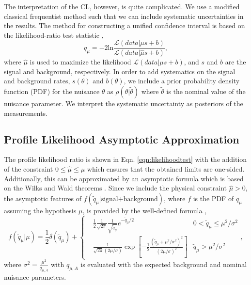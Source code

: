 The interpretation of the CL, however, is quite complicated. We use a modified classical frequentist method such that we can include systematic uncertainties in the results. The method for constructing a unified confidence interval is based on the likelihood-ratio test statistic \cite{feldman_unified_1998}, 
\begin{equation}\label{eqn:likelihoodtest}
q_\mu=-2\text{ln}\frac{\mathcal{L}(data|\mu s+b)}{\mathcal{L}(data|\hat{\mu} s+b)},
\end{equation}
where $\hat{\mu}$ is used to maximize the likelihood $\mathcal{L}(data|\mu s+b)$, and $s$ and $b$ are the signal and background, respectively. In order to add systematics on the signal and background rates, $s(\theta)$ and $b(\theta)$, we include a prior probability density function (PDF) for the nuisance $\theta$ as $\rho(\theta|\widetilde{\theta})$ where $\widetilde{\theta}$ is the nominal value of the nuisance parameter. We interpret the systematic uncertainty as posteriors of the measurements.

\subsection{Profile Likelihood Asymptotic Approximation}\label{subsec:Asymptotic}

The profile likelihood ratio is shown in Eqn. \ref{eqn:likelihoodtest} with the addition of the constraint $0\leq\widehat{\mu}\leq\mu$ which ensures that the obtained limits are one-sided. Additionally, this can be approximated by an asymptotic formula which is based on the Wilks and Wald theorems \cite{cowan_asymptotic_2011}. Since we include the physical constraint $\widehat{\mu}>0$, the asymptotic features of $f(\widetilde{q}_\mu|\text{signal+background})$, where $f$ is the PDF of $q_\mu$ assuming the hypothesis $\mu$, is provided by the well-defined formula \cite{cowan_asymptotic_2011}, 
\begin{equation}\label{eqn:profileLikelihood}
f(\widetilde{q}_\mu|\mu)=\frac{1}{2}\delta(\widetilde{q}_\mu)+\left\{
\begin{split}
&\frac{1}{2}\frac{1}{\sqrt{2\pi}}\frac{1}{\sqrt{\widetilde{q}_\mu}}e^{-\widetilde{q}_\mu/2} & 0<\widetilde{q}_\mu\leq\mu^2/\sigma^2 \\
&\frac{1}{\sqrt{2\pi}(2\mu/\sigma)}\exp[-\frac{1}{2}\frac{(\widetilde{q}_\mu+\mu^2/\sigma^2)^2}{(2\mu/\sigma)^2}] & \widetilde{q}_\mu>\mu^2/\sigma^2
\end{split},
\end{equation}
where $\sigma^2=\frac{\mu^2}{q_{\mu,A}}$ with $q_{\mu,A}$ is evaluated with the expected background and nominal nuisance parameters. 

